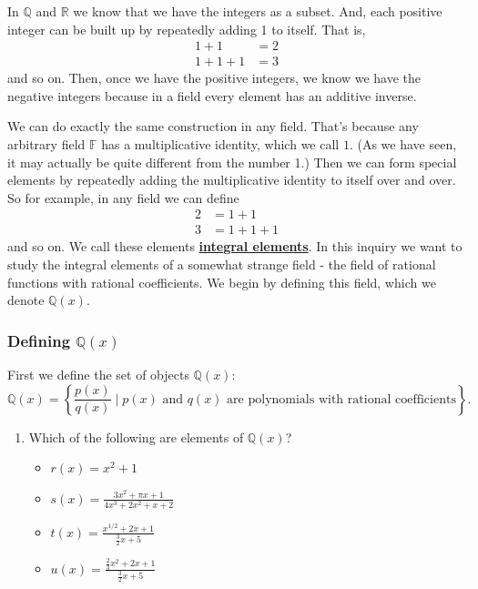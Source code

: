 \documentclass[11pt]{article}
\newenvironment{task}
	{\begin{mdframed}[linecolor=lightgray, linewidth=3pt]\raggedright}
	{\end{mdframed}}
\renewcommand\emph[1]{\underline{\bf{#1}}} %
\theoremstyle{definition}
\begin{document}
\begin{task}
In $\mathbb{Q}$ and $\mathbb{R}$ we know that we have the integers as a subset. And, each positive integer can be built up by repeatedly adding 1 to itself.
That is,
\begin{align*}
  1 + 1 &= 2\\
  1+ 1 + 1 &= 3
\end{align*}
and so on. Then, once we have the positive integers, we know we have the negative integers because in a field every element has an additive inverse. 

We can do exactly the same construction in any field. That's because any arbitrary field $\mathbb{F}$ has a multiplicative identity, which we call $1$. (As we have seen,
it may actually be quite different from the number 1.) Then we can form special elements by repeatedly adding the multiplicative identity to itself over and
over. So for example, in any field we can define
\begin{align*}
  2 &= 1 + 1\\
  3 &= 1 + 1 + 1
\end{align*}
and so on. We call these elements \emph{integral elements}. In this inquiry we want to study the integral elements of a somewhat strange field - the field
of rational functions with rational coefficients. We begin by defining this field, which we denote $\mathbb{Q}(x)$.

\subsubsection{Defining $\mathbb{Q}(x)$}

First we define the set of objects $\mathbb{Q}(x)$:
\[ \mathbb{Q}(x) = \left\{ \frac{p(x)}{q(x)} \mid p(x) \text{ and }q(x)\text{ are polynomials with rational coefficients} \right\}.\]

\begin{enumerate}
  \item Which of the following are elements of $\mathbb{Q}(x)$?
    \begin{itemize}
      \item $r(x) = x^2 + 1$
        \vspace{.5in}
      \item $s(x) = \frac{3x^2+\pi x + 1}{4x^3 + 2x^2 + x + 2}$
        \vspace{.5in}
      \item $t(x) = \frac{x^{1/2}+2x + 1}{\frac{3}{2}x+5}$
        \vspace{.5in}
      \item $u(x) = \frac{\frac{2}{3}x^2+2x + 1}{\frac{3}{2}x+5}$
        \vspace{.5in}
    \end{itemize}
\end{enumerate}


\end{task}
\end{document}
